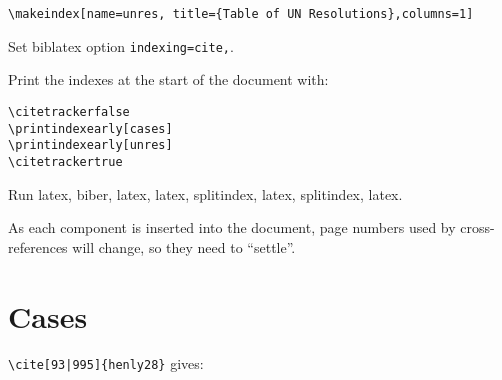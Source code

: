 \begin{verbatim}
\makeindex[name=unres, title={Table of UN Resolutions},columns=1]
\end{verbatim}

Set biblatex option \verb|indexing=cite,|.

Print the indexes at the start of the document with:

\begin{verbatim}
\citetrackerfalse
\printindexearly[cases]
\printindexearly[unres]
\citetrackertrue
\end{verbatim}

Run latex, biber, latex, latex, splitindex, latex, splitindex, latex.

As each component is inserted into the document, page numbers used by cross-references will change, so they need to ``settle''.


\newpage
\section{Cases}

\newpage
{}

\newpage
{}

\newpage
{}

\newpage
{}

\newpage
{}

\newpage
{}

\verb>\cite[93|995]{henly28}> gives: \cite[93|995]{henly28}

\newpage
{}

\newpage
{}

\newpage
{}

\newpage
{}

\newpage
{}

\newpage
{}

\newpage
{}


